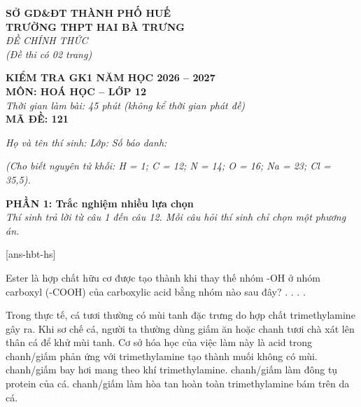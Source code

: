 \documentclass[11pt,a4paper]{article}
\begin{document}
\begin{minipage}[t]{0.48\textwidth}
\textbf{SỞ GD\&ĐT THÀNH PHỐ HUẾ}\\
\textbf{TRƯỜNG THPT HAI BÀ TRƯNG}\\
\textit{ĐỀ CHÍNH THỨC}\\
\textit{(Đề thi có 02 trang)}
\end{minipage}
\hfill
\begin{minipage}[t]{0.48\textwidth}
\raggedleft
\textbf{\color{hfRed}KIỂM TRA GK1 NĂM HỌC 2026 -- 2027}\\
\textbf{MÔN: HOÁ HỌC -- LỚP 12}\\
\textit{Thời gian làm bài: 45 phút (không kể thời gian phát đề)}\\
\textbf{MÃ ĐỀ: 121}
\end{minipage}

\vspace{3pt}
\noindent
\textit{Họ và tên thí sinh:} \dotfill \textit{Lớp:} \dotfill \textit{Số báo danh:} \dotfill

\vspace{2pt}
\noindent
\textit{\footnotesize (Cho biết nguyên tử khối: H = 1; C = 12; N = 14; O = 16; Na = 23; Cl = 35,5).}

\vspace{3pt}
\noindent
\textbf{\color{mainGreen}PHẦN 1: Trắc nghiệm nhiều lựa chọn}\\
\textit{Thí sinh trả lời từ câu 1 đến câu 12. Mỗi câu hỏi thí sinh chỉ chọn một phương án.}

[ans-hbt-hs]

\begin{ex}
Ester là hợp chất hữu cơ được tạo thành khi thay thế nhóm -OH ở nhóm carboxyl (-COOH) của carboxylic acid bằng nhóm nào sau đây?
\choice
{\True {}.}
{.}
{.}
{.}
\end{ex}

\begin{ex}
Trong thực tế, cá tươi thường có mùi tanh đặc trưng do hợp chất trimethylamine  gây ra. Khi sơ chế cá, người ta thường dùng giấm ăn hoặc chanh tươi chà xát lên thân cá để khử mùi tanh. Cơ sở hóa học của việc làm này là
\choice
{\True acid trong chanh/giấm phản ứng với trimethylamine tạo thành muối không có mùi.}
{chanh/giấm bay hơi mang theo khí trimethylamine.}
{chanh/giấm làm đông tụ protein của cá.}
{chanh/giấm làm hòa tan hoàn toàn trimethylamine bám trên da cá.}
\end{ex}
\end{document}
